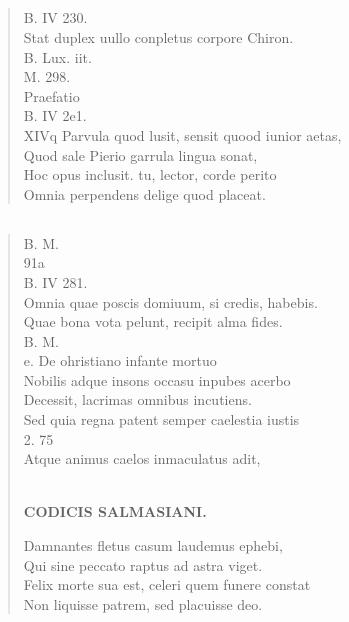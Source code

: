 \documentclass[11pt, a4paper]{report}
\begin{document}
            \subsection*{}
      \begin{verse}
      B. IV 230. \\ Stat duplex uullo conpletus corpore Chiron. \\ B. Lux. iit. \\ M. 298. \\ Praefatio \\ B. IV 2e1. \\  \lbrack XIVq Parvula quod lusit, sensit quood iunior aetas, \\ Quod sale Pierio garrula lingua sonat, \\ Hoc opus inclusit. tu, lector, corde perito \\ Omnia perpendens delige quod placeat. \\ 
      \end{verse}
  
            \subsection*{}
      \begin{verse}
      B. M. \\ 91a \\ B. IV 281. \\ Omnia quae poscis domiuum, si credis, habebis. \\ Quae bona vota pelunt, recipit alma fides. \\ B. M. \\ e. De ohristiano infante mortuo \\ Nobilis adque insons occasu inpubes acerbo \\ Decessit, lacrimas omnibus incutiens. \\ Sed quia regna patent semper caelestia iustis \\ 2. 75 \\ Atque animus caelos inmaculatus adit, \\ 
        ﻿\pagebreak 
    \begin{center} \textbf{CODICIS SALMASIANI.} \end{center} \marginpar{[123]} Damnantes fletus casum laudemus ephebi, \\ Qui sine peccato raptus ad astra viget. \\ Felix morte sua est, celeri quem funere constat \\ Non liquisse patrem, sed placuisse deo. \\ 
      \end{verse}
  
\end{document}
